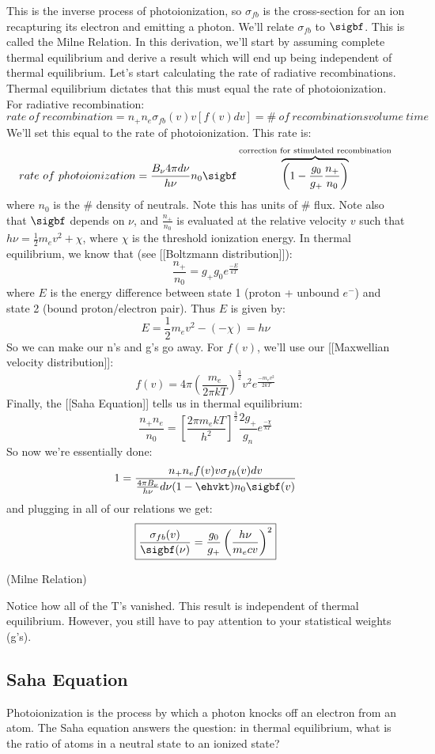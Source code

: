 \documentclass{article}
\def\hf{\frac12}
\def\hf{\frac12}
\begin{document}
\def\sigfb{\sigma_{fb}}
This is the inverse process of photoionization, so $\sigfb$ is the cross-section
for an ion recapturing its electron and emitting a photon.  We'll relate
$\sigfb$ to $\sigbf$.  This is called the Milne Relation.  In this derivation,
we'll start by assuming complete thermal equilibrium and derive a result which
will end up being independent of thermal equilibrium.  Let's start calculating
the rate of radiative recombinations.  Thermal equilibrium dictates that this
must equal the rate of photoionization.  For radiative recombination:
$$rate\ of\ recombination
=n_+n_e\sigfb(v)v[f(v)dv]={\#\ of\ recombinations}{ volume\ time}$$
We'll set this equal to the rate of photoionization. This rate is:
$$rate\ of\ photoionization
=\frac{B_\nu4\pi d\nu}{ h\nu}n_0\sigbf
\overbrace{\left(1-\frac{g_0}{ g_+}\frac{n_+}{ n_0}\right)}^\text{correction for
stimulated recombination}$$
where $n_0$ is the \# density of neutrals. Note this has units of \# flux.
Note also that $\sigbf$ depends on $\nu$, and $\frac{n_+}{ n_0}$ is evaluated
at the relative velocity $v$ such that $h\nu=\hf m_ev^2+\chi$, where $\chi$
is the threshold ionization energy.  In thermal equilibrium, we know that (see [[Boltzmann distribution]]):
$$\frac{n_+}{ n_0}={g_+}{ g_0}e^\frac{-E}{ kT}$$
where $E$ is the energy difference between state 1 (proton + unbound $e^-$)
and state 2 (bound proton/electron pair).  Thus $E$ is given by:
$$E=\hf m_ev^2-(-\chi)=h\nu$$
So we can make our n's and g's go away.  For $f(v)$, we'll use our [[Maxwellian velocity distribution]]:
$$f(v)=4\pi\left(\frac{m_e}{ 2\pi kT}\right)^\frac{3}{ 2}v^2e^\frac{-m_ev^2}{ 2kT}$$
Finally, the [[Saha Equation]] tells us in thermal equilibrium:
$$\frac{n_+n_e}{ n_0}=\left[\frac{2\pi m_ekT}{ h^2}\right]^\frac{3}{ 2}\frac{2g_+}{ g_n}
e^\frac{-\chi}{ kT}$$
So now we're essentially done:
$$1=\frac{n_+n_ef(v)v\sigfb(v)dv}{\frac{4\pi B_\nu}{ h\nu}d\nu(1-\ehvkt)
n_0\sigbf(v)}$$
and plugging in all of our relations we get:
$$\boxed{\frac{\sigfb(v)}{\sigbf(\nu)}=
\frac{g_0}{ g_+}\left(\frac{h\nu}{ m_ecv}\right)^2}$$
\centerline{(Milne Relation)}
Notice how all of the T's vanished.  
This result is independent of thermal
equilibrium.  However, you still have to pay attention to your statistical
weights (g's).


\subsection{Saha Equation}

Photoionization is the process by which a photon knocks off an electron from an atom. The Saha equation answers the question: in thermal equilibrium, what is the ratio of atoms in a neutral state to an ionized state?
\end{document}
